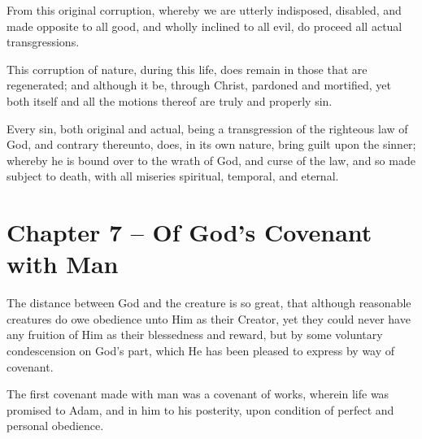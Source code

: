 \begin{outerlst}[left=0pt,labelsep=0pt]
\begin{innerlst}[resume*]
\item From this original corruption, whereby we are utterly indisposed, disabled, and made opposite to all good, and wholly inclined to all evil, do proceed all actual transgressions.   

\item This corruption of nature, during this life, does remain in those that are regenerated; and although it be, through Christ, pardoned and mortified, yet both itself and all the motions thereof are truly and properly sin.   

\item Every sin, both original and actual, being a transgression of the righteous law of God, and contrary thereunto, does, in its own nature, bring guilt upon the sinner; whereby he is bound over to the wrath of God, and curse of the law, and so made subject to death, with all miseries spiritual, temporal, and eternal.  
\end{innerlst}

\item
{}
\section{Chapter 7 -- Of God's Covenant with Man}
\begin{innerlst}[resume*]

\item The distance between God and the creature is so great, that although reasonable creatures do owe obedience unto Him as their Creator, yet they could never have any fruition of Him as their blessedness and reward, but by some voluntary condescension on God's part, which He has been pleased to express by way of covenant.   

\item The first covenant made with man was a covenant of works, wherein life was promised to Adam, and in him to his posterity, upon condition of perfect and personal obedience.   


\end{innerlst}
\end{outerlst}
